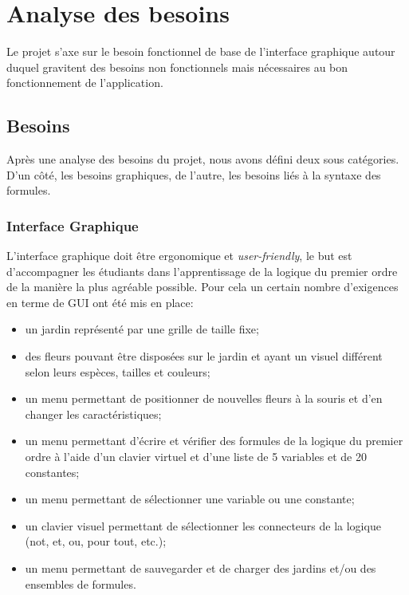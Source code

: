 \chapter{Analyse des besoins}

Le projet s'axe sur le besoin fonctionnel de base de l'interface graphique autour duquel gravitent des besoins non fonctionnels mais nécessaires au bon fonctionnement de l'application.

\section{Besoins}

Après une analyse des besoins du projet, nous avons défini deux sous catégories. D'un côté, les besoins graphiques, de l'autre, les besoins liés à la syntaxe des formules.

\subsection{Interface Graphique}

L'interface graphique doit être ergonomique et \textit{user-friendly}, le but est d'accompagner les étudiants dans l'apprentissage de la logique du premier ordre de la manière la plus agréable possible. Pour cela un certain nombre d'exigences en terme de GUI ont été mis en place:

\begin{itemize}
\item un jardin représenté par une grille de taille fixe;
\item des fleurs pouvant être disposées sur le jardin et ayant un visuel différent selon leurs espèces, tailles et couleurs;
\item un menu permettant de positionner de nouvelles fleurs à la souris et d’en changer les caractéristiques;
\item  un menu permettant d’écrire et vérifier des formules de la logique du premier ordre à l’aide d’un clavier virtuel et d’une liste de 5 variables et de 20 constantes;
\item  un menu permettant de sélectionner une variable ou une constante;
\item  un clavier visuel permettant de sélectionner les connecteurs de la logique (not, et, ou, pour tout, etc.);
\item  un menu permettant de sauvegarder et de charger des jardins et/ou des ensembles de formules.
\end{itemize}

